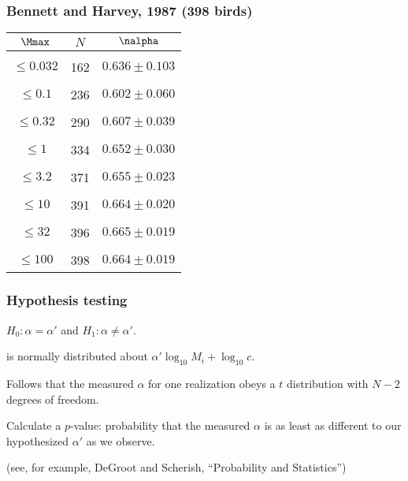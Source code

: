 \begin{frame}
  \frametitle{Bennett and Harvey, 1987 (398 birds)}

  \begin{center}
    \begin{tabular}{c|c|c}
      $\Mmax$   & $N$ & $\nalpha$  \\ \hline
      & & \\
      $\leq 0.032$   & 162 & $0.636 \pm 0.103$ \\
      & & \\
      $\leq  0.1$    & 236 & $0.602 \pm 0.060$ \\
      & & \\
      $\leq 0.32$    & 290 & $0.607 \pm 0.039$ \\
      & & \\
      $\leq    1$    & 334 & $0.652 \pm 0.030$ \\
      & & \\
      $\leq  3.2$    & 371 & $0.655 \pm 0.023$ \\
      & & \\
      $\leq   10$    & 391 & $0.664 \pm 0.020$ \\
      & & \\
      $\leq   32$    & 396 & $0.665 \pm 0.019$ \\
      & & \\
      $\leq  100$    & 398 & $0.664 \pm 0.019$ \\
    \end{tabular}
  \end{center}


\end{frame}

\begin{frame}
  \frametitle{Hypothesis testing}


\inv

$H_0: \alpha = \alpha'$ and $H_1: \alpha \ne \alpha'.$

is normally distributed
about $\alpha' \log_{10} M_i + \log_{10} c$.

Follows that the measured $\alpha$ for
one realization obeys
a $t$ distribution with $N-2$ degrees of freedom.

Calculate a $p$-value: probability that the measured
$\alpha$ is as least as different to our hypothesized
$\alpha'$ as we observe.

{\tiny (see, for example, DeGroot and Scherish, ``Probability and Statistics'')}

\vis

\end{frame}

